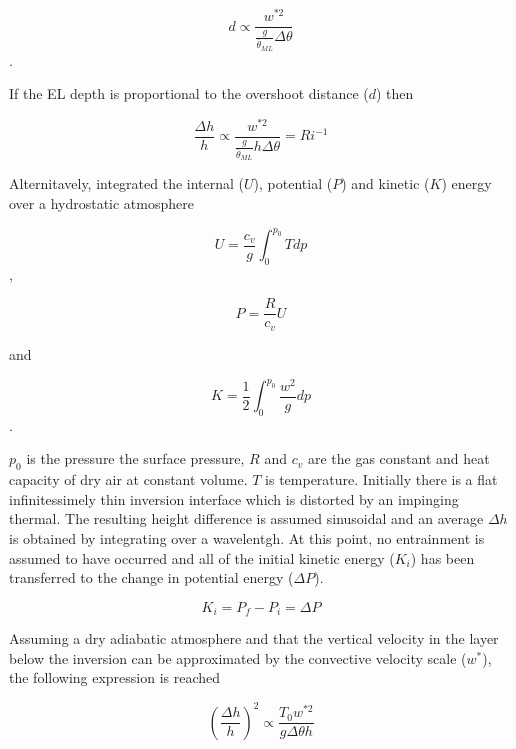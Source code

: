 \begin{equation}
d \propto \frac{w^{*2}}{\frac{g}{\overline{\theta}_{ML}} \Delta \theta} 
\end{equation}. 

If the \acs{EL} depth is proportional to the overshoot distance ($d$) then

\begin{equation}
\frac{\Delta h}{h} \propto \frac{w^{*2}}{\frac{g}{\overline{\theta}_{ML}} h \Delta \theta} = Ri^{-1} 
\end{equation} 

Alternitavely, \citeauthor{Boers89} \citeyear{Boers89} integrated the internal ($U$), potential ($P$) and kinetic ($K$) energy over a hydrostatic atmosphere

\begin{equation}
U = \frac{c_{v}}{g}\int^{p_{0}}_{0}Tdp
\end{equation},

\begin{equation}
P = \frac{R}{c_{v}}U
\end{equation}

and

\begin{equation}
K = \frac{1}{2} \int^{p_{0}}_{0}\frac{w^{2}}{g}dp
\end{equation}.

$p_{0}$ is the pressure the surface pressure, $R$ and $c_{v}$ are the gas constant and heat capacity of dry air at constant volume.
$T$ is temperature.  Initially there is a flat infinitessimely thin inversion interface  which is distorted by an
impinging thermal.  The resulting height difference is assumed sinusoidal and an average $\Delta h$ is obtained by integrating 
over a wavelentgh.  At this point, no entrainment is assumed to have occurred and all of the initial kinetic energy ($K_{i}$) has been transferred to the change in potential energy ($\Delta P$).

\begin{equation}
K_{i} = P_{f} - P_{i} = \Delta P
\end{equation}

Assuming a dry adiabatic atmosphere and that the vertical velocity in the layer below the inversion can be approximated by the convective velocity scale ($w^{*}$), the following expression is reached

\begin{equation}
\left(\frac{\Delta h}{h}\right)^{2} \propto \frac{T_{0} w^{*2}}{g \Delta \theta h}
\end{equation}

